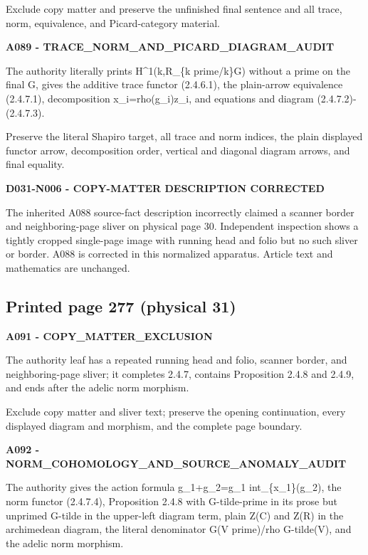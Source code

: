 \documentclass[10pt,a4paper]{article}
\begin{document}
Exclude copy matter and preserve the unfinished final sentence and all trace, norm, equivalence, and Picard-category material.

\textbf{A089 - TRACE\_NORM\_AND\_PICARD\_DIAGRAM\_AUDIT}

The authority literally prints H\^{}1(k,R\_\{k prime/k\}G) without a prime on the final G, gives the additive trace functor (2.4.6.1), the plain-arrow equivalence (2.4.7.1), decomposition x\_i=rho(g\_i)z\_i, and equations and diagram (2.4.7.2)-(2.4.7.3).

Preserve the literal Shapiro target, all trace and norm indices, the plain displayed functor arrow, decomposition order, vertical and diagonal diagram arrows, and final equality.

\textbf{D031-N006 - COPY-MATTER DESCRIPTION CORRECTED}

The inherited A088 source-fact description incorrectly claimed a scanner border and neighboring-page sliver on physical page 30. Independent inspection shows a tightly cropped single-page image with running head and folio but no such sliver or border. A088 is corrected in this normalized apparatus. Article text and mathematics are unchanged.

\subsection{Printed page 277 (physical 31)}

\textbf{A091 - COPY\_MATTER\_EXCLUSION}

The authority leaf has a repeated running head and folio, scanner border, and neighboring-page sliver; it completes 2.4.7, contains Proposition 2.4.8 and 2.4.9, and ends after the adelic norm morphism.

Exclude copy matter and sliver text; preserve the opening continuation, every displayed diagram and morphism, and the complete page boundary.

\textbf{A092 - NORM\_COHOMOLOGY\_AND\_SOURCE\_ANOMALY\_AUDIT}

The authority gives the action formula g\_1+g\_2=g\_1 int\_\{x\_1\}(g\_2), the norm functor (2.4.7.4), Proposition 2.4.8 with G-tilde-prime in its prose but unprimed G-tilde in the upper-left diagram term, plain Z(C) and Z(R) in the archimedean diagram, the literal denominator G(V prime)/rho G-tilde(V), and the adelic norm morphism.
\end{document}
